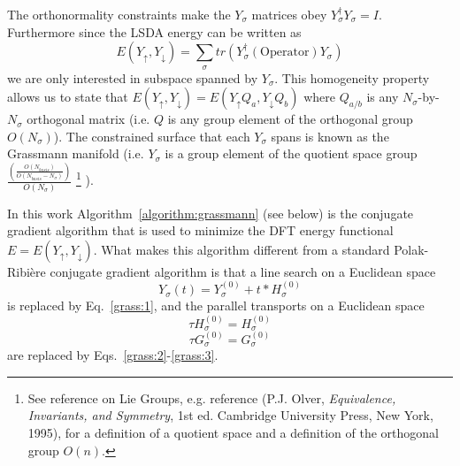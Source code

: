 The orthonormality constraints make the $Y_{\sigma}$ matrices
obey $Y_{\sigma}^{\dag}Y_{\sigma}=I$. 
Furthermore since the LSDA energy can be written as
\begin{equation}
E(Y_{\uparrow},Y_{\downarrow}) = \sum_{\sigma} 
        tr \left( Y_{\sigma}^{\dag} (\mathrm{Operator}) Y_{\sigma} \right)
\end{equation}
we are only interested in subspace spanned by $Y_\sigma$.
This homogeneity property allows us to state that
$E(Y_{\uparrow},Y_{\downarrow}) = E(Y_{\uparrow}Q_a,Y_{\downarrow}Q_b)$ 
where $Q_{a/b}$ is any $N_{\sigma}$-by-$N_{\sigma}$
orthogonal matrix (i.e. $Q$ is any group element of the orthogonal
group $O(N_{\sigma})$).  The constrained surface that each $Y_{\sigma}$ spans
is known as the Grassmann manifold (i.e. $Y_{\sigma}$ is a group element
of the quotient space group 
$\frac{\left(\frac{O(N_{basis})}{O(N_{basis}-N_{\sigma})}\right)}{O(N_{\sigma})}$
\footnote{See reference on Lie Groups, e.g. reference (P.J. Olver, 
\textit{Equivalence, Invariants, and Symmetry}, 1st ed. Cambridge University Press,
New York, 1995), for a definition of a quotient space and a definition of the 
          orthogonal group $O(n)$.
         }
).

In this work Algorithm~\ref{algorithm:grassmann} (see below) is the 
conjugate gradient
algorithm that is used to minimize the DFT energy functional
$E=E\left( Y_{\uparrow},Y_{\downarrow} \right)$.  What makes this
algorithm different from a standard 
Polak-Ribi\`{e}re conjugate gradient algorithm
is that a line search on a Euclidean space 
\[ Y_{\sigma}(t) = Y_{\sigma}^{(0)} + t*H_{\sigma}^{(0)} \]
is replaced by Eq.~\ref{grass:1}, 
and the parallel transports on a Euclidean space
\[ \tau H_{\sigma}^{(0)} = H_{\sigma}^{(0)} \]
\[ \tau G_{\sigma}^{(0)} = G_{\sigma}^{(0)} \]
are replaced by Eqs.~\ref{grass:2}-\ref{grass:3}.

